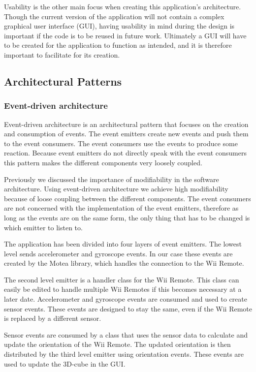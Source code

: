 Usability is the other main focus when creating this application’s architecture. Though the current version of the application will not contain a complex graphical user interface (GUI), having usability in mind during the design is important if the code is to be reused in future work. Ultimately a GUI will have to be created for the application to function as intended, and it is therefore important to facilitate for its creation.

\subsection{Architectural Patterns}
\subsubsection{Event-driven architecture}
Event-driven architecture is an architectural pattern that focuses on the creation and consumption of events. The event emitters create new events and push them to the event consumers. The event consumers use the events to produce some reaction. Because event emitters do not directly speak with the event consumers this pattern makes the different components very loosely coupled.

Previously we discussed the importance of modifiability in the software architecture. Using event-driven architecture we achieve high modifiability because of loose coupling between the different components. The event consumers are not concerned with the implementation of the event emitters, therefore as long as the events are on the same form, the only thing that has to be changed is which emitter to listen to. 

The application has been divided into four layers of event emitters. The lowest level sends accelerometer and gyroscope events. In our case these events are created by the Motea library, which handles the connection to the Wii Remote. 

The second level emitter is a handler class for the Wii Remote. This class can easily be edited to handle multiple Wii Remotes if this becomes necessary at a later date. Accelerometer and gyroscope events are consumed and used to create sensor events. These events are designed to stay the same, even if the Wii Remote is replaced by a different sensor.

Sensor events are consumed by a class that uses the sensor data to calculate and update the orientation of the Wii Remote. The updated orientation is then distributed by the third level emitter using orientation events. These events are used to update the 3D-cube in the GUI. 

